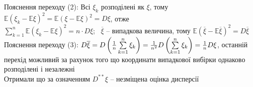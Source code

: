 \documentclass[11 pt]{article}
\begin{document}
Пояснення переходу (2): Всі $\xi_k$ розподілені як $\xi$, 
тому $\mathbb{E} (\xi_k - \mathbb{E} \xi)^2 = \mathbb{E} (\xi - \mathbb{E} \xi)^2 = D \xi$, отже \\
$\sum_{k = 1}^{n}  \mathbb{E} (\xi_k - \mathbb{E} \xi)^2 = n \cdot D \xi$; \ 
$\overline{\xi}$ -- випадкова величина, тому 
$\mathbb{E} (\overline{\xi} - \mathbb{E} \overline{\xi})^2 = D \overline{\xi}$  \\ 
Пояснення переходу (3): 
$D \overline{\xi} = D \left(\frac{1}{n}\sum_{k = 1}^{n}\limits \xi_k\right) = 
\frac{1}{n^2}D\left(\sum_{k = 1}^{n}\limits \xi_k\right) = \frac{1}{n}D \xi$,
 останній перехід можливий за рахунок того що координати випадкової вибірки однаково розподілені і незалежні \\
Отримали що за означенням $D^{**} \xi$ -- незміщена оцінка дисперсії 
\end{document}
